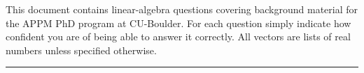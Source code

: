 \documentclass[11pt,fleqn]{article}
\begin{document}
         


%
%
%
%
%

\noindent This document contains linear-algebra questions covering background material for the APPM PhD program at CU-Boulder. For each question simply indicate how confident you are of being able to answer it correctly. All vectors are lists of real numbers unless specified otherwise.

\vspace{3mm}

\hrule 
\end{document}
